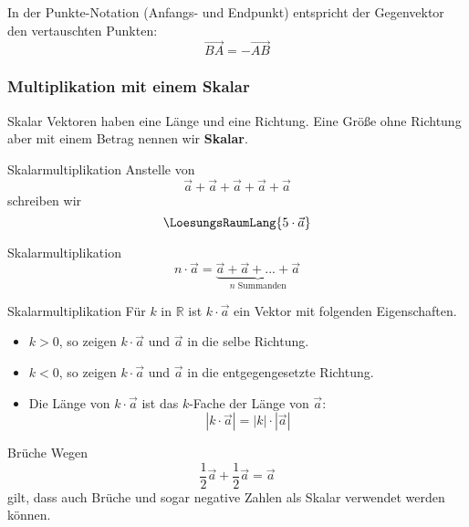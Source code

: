 
\begin{bemerkung}{}{}
  In der Punkte-Notation (Anfangs- und Endpunkt) entspricht der
  Gegenvektor  den vertauschten Punkten:
  $$\overrightarrow{BA} = - \overrightarrow{AB}$$
\end{bemerkung}


\newpage


\subsubsection{Multiplikation mit einem Skalar}
\begin{definition}{Skalar}{}
  Vektoren haben eine Länge und eine Richtung. Eine Größe ohne
  Richtung aber mit einem Betrag nennen wir \textbf{Skalar}. 
\end{definition}

\begin{beispiel}{Skalarmultiplikation}{}
  Anstelle von
  $$\vec{a}+\vec{a}+\vec{a}+\vec{a}+\vec{a}$$
  schreiben wir
  $$\LoesungsRaumLang{5\cdot{}\vec{a}}$$
\end{beispiel}

\begin{definition}{Skalarmultiplikation}{}
  $$n\cdot{}\vec{a} = \underbrace{\vec{a} + \vec{a} + ... + \vec{a}}_{n \text{ Summanden}}$$
\end{definition}

\begin{definition}{Skalarmultiplikation}{}
  Für $k$ in $\mathbb{R}$ ist $k\cdot{}\vec{a}$ ein Vektor mit
  folgenden Eigenschaften.

  \begin{itemize}
  \item $k>0$, so zeigen $k\cdot{}\vec{a}$ und $\vec{a}$ in die selbe Richtung.
  \item $k<0$, so zeigen $k\cdot{}\vec{a}$ und $\vec{a}$ in die entgegengesetzte Richtung.
  \item Die Länge von $k\cdot{}\vec{a}$ ist das $k$-Fache der Länge
    von $\vec{a}$: $$|k\cdot{}\vec{a}| = |k|\cdot{}|\vec{a}|$$
   \end{itemize}
\end{definition}

\begin{beispiel}{Brüche}{}
  Wegen
  $$\frac12\vec{a} + \frac12\vec{a} = \vec{a}$$
  gilt, dass auch Brüche und sogar  negative Zahlen als Skalar
  verwendet werden können.
\end{beispiel}

